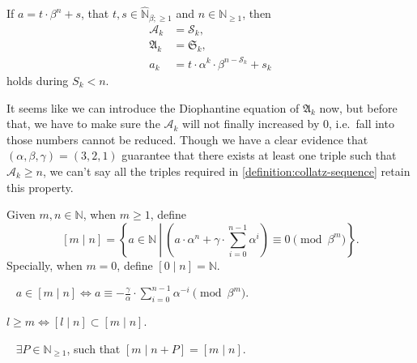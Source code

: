 \begin{corollary}
    If $a = t \cdot \beta^n + s$, that $t, s \in \widehat{\mathbb{N}}_{\beta;\ge1}$ and $n \in \mathbb{N}_{\ge1}$, then
    \begin{align*}
        \mathcal{A}_k &= \mathcal{S}_k, \\
        \mathfrak{A}_k &= \mathfrak{S}_k,\\
        a_k &= t \cdot \alpha^{k} \cdot \beta^{n-\mathcal{S}_k} + s_k
    \end{align*}
    holds during $S_k < n$.
\end{corollary}

It seems like we can introduce the Diophantine equation of $\mathfrak{A}_k$ now, but before that, we have to make sure the $\mathcal{A}_k$ will not finally increased by $0$, i.e.\ fall into those numbers cannot be reduced.
Though we have a clear evidence that $(\alpha, \beta, \gamma) = (3, 2, 1)$ guarantee that there exists at least one triple such that $\mathcal{A}_k \ge n$, we can't say all the triples required in \cref{definition:collatz-sequence} retain this property.
\begin{definition}
Given $m,n \in \mathbb{N}$, when $m \ge 1$, define
\[ [m\mid n] = \left\{a \in \mathbb{N}\ \left|\ \left(a\cdot\alpha^n + \gamma\cdot\sum_{i = 0}^{n-1}\alpha^i\right) \equiv 0 \pmod{\beta^{m}}\right.\right\}. \]
Specially, when $m = 0$, define $[0\mid n] = \mathbb{N}$.
\end{definition}
\begin{proposition}~\label{proposition:equivalence-of-classes}
    $a \in [m\mid n] \Longleftrightarrow a\equiv -\frac{\gamma}{\alpha}\cdot\sum_{i=0}^{n-1}\alpha^{-i}\pmod{\beta^{m}}$.
\end{proposition}
\begin{proposition}
    $ l \ge m \Longleftrightarrow [l\mid n] \subset [m\mid n]$.
\end{proposition}
\begin{proposition}~\label{proposition:avaliable-in-finity-step}%
    $\exists P \in \mathbb{N}_{\ge1}$, such that $[m \mid n + P ] = [m\mid n]$.
\end{proposition}
